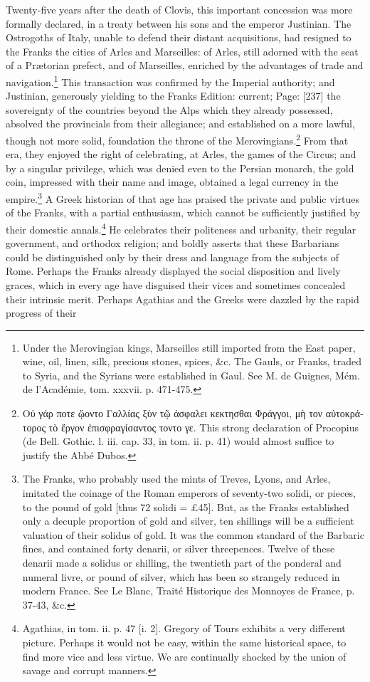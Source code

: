 Twenty-five years after the death of Clovis, this important concession was more formally declared, in a treaty between his sons and the emperor Justinian. The Ostrogoths of Italy, unable to defend their distant acquisitions, had resigned to the Franks the cities of Arles and Marseilles: of Arles, still adorned with the seat of a Prætorian prefect, and of Marseilles, enriched by the advantages of trade and navigation.\footnote{Under the Merovingian kings, Marseilles still imported from the East paper, wine, oil, linen, silk, precious stones, spices, \&c. The Gauls, or Franks, traded to Syria, and the Syrians were established in Gaul. See M. de Guignes, Mém. de l\texthebrew{}’Académie, tom. xxxvii. p. 471-475.} This transaction was confirmed by the Imperial authority; and Justinian, generously yielding to the Franks Edition: current; Page: [237] the sovereignty of the countries beyond the Alps which they already possessed, absolved the provincials from their allegiance; and established on a more lawful, though not more solid, foundation the throne of the Merovingians.\footnote{\textgreek{Ο\texthebrew{ὐ} γάρ ποτε \texthebrew{ᾥ}οντο Γαλλίας ξ\texthebrew{ὺ}ν τ\texthebrew{ῷ ἀ}σφαλει κεκτησθαι Φράγγοι, μ\texthebrew{ὴ} τον α\texthebrew{ὐ}τοκράτορος τ\texthebrew{ὸ ἔ}ργον \texthebrew{ἐ}πισφραγίσαντος τοντο γε}. This strong declaration of Procopius (de Bell. Gothic. l. iii. cap. 33, in tom. ii. p. 41) would almost suffice to justify the Abbé Dubos.} From that era, they enjoyed the right of celebrating, at Arles, the games of the Circus; and by a singular privilege, which was denied even to the Persian monarch, the gold coin, impressed with their name and image, obtained a legal currency in the empire.\footnote{The Franks, who probably used the mints of Treves, Lyons, and Arles, imitated the coinage of the Roman emperors of seventy-two solidi, or pieces, to the pound of gold [thus 72 solidi = £45]. But, as the Franks established only a decuple proportion of gold and silver, ten shillings will be a sufficient valuation of their solidus of gold. It was the common standard of the Barbaric fines, and contained forty denarii, or silver threepences. Twelve of these denarii made a solidus or shilling, the twentieth part of the ponderal and numeral livre, or pound of silver, which has been so strangely reduced in modern France. See Le Blanc, Traité Historique des Monnoyes de France, p. 37-43, \&c.} A Greek historian of that age has praised the private and public virtues of the Franks, with a partial enthusiasm, which cannot be sufficiently justified by their domestic annals.\footnote{Agathias, in tom. ii. p. 47 [i. 2]. Gregory of Tours exhibits a very different picture. Perhaps it would not be easy, within the same historical space, to find more vice and less virtue. We are continually shocked by the union of savage and corrupt manners.} He celebrates their politeness and urbanity, their regular government, and orthodox religion; and boldly asserts that these Barbarians could be distinguished only by their dress and language from the subjects of Rome. Perhaps the Franks already displayed the social disposition and lively graces, which in every age have disguised their vices and sometimes concealed their intrinsic merit. Perhaps Agathias and the Greeks were dazzled by the rapid progress of their 